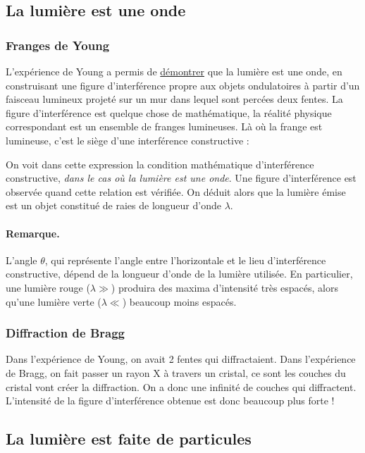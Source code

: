 \documentclass[11pt]{book}
\begin{document}
\subsection{La lumière est une onde}
\subsubsection{Franges de Young}
L'expérience de Young a permis de \underline{démontrer} que la lumière est une onde, en construisant une figure d'interférence propre aux objets ondulatoires à partir d'un faisceau lumineux projeté sur un mur dans lequel sont percées deux fentes. La figure d'interférence est quelque chose de mathématique, la réalité physique correspondant est un ensemble de franges lumineuses. Là où la frange est lumineuse, c'est le siège d'une interférence constructive :

On voit dans cette expression la condition mathématique d'interférence constructive, \textit{dans le cas où la lumière est une onde}. Une figure d'interférence est observée quand cette relation est vérifiée. On déduit alors que la lumière émise est un objet constitué de raies de longueur d'onde $\lambda$. 
\paragraph{Remarque.} L'angle $\theta$, qui représente l'angle entre l'horizontale et le lieu d'interférence constructive, dépend de la longueur d'onde de la lumière utilisée. En particulier, une lumière rouge ($\lambda \gg$) produira des maxima d'intensité très espacés, alors qu'une lumière verte ($\lambda \ll$) beaucoup moins espacés.
\subsubsection{Diffraction de Bragg}
Dans l'expérience de Young, on avait 2 fentes qui diffractaient. Dans l'expérience de Bragg, on fait passer un rayon X à travers un cristal, ce sont les couches du cristal vont créer la diffraction. On a donc une infinité de couches qui diffractent. L'intensité de la figure d'interférence obtenue est donc beaucoup plus forte !

\subsection{La lumière est faite de particules}
\end{document}
